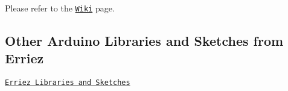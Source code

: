 Please refer to the \href{https://github.com/Erriez/ErriezArduinoLibrariesAndSketches/wiki}{\tt Wiki} page.

\subsection*{Other Arduino Libraries and Sketches from Erriez}


\begin{DoxyItemize}
\item \href{https://github.com/Erriez/ErriezArduinoLibrariesAndSketches}{\tt Erriez Libraries and Sketches} 
\end{DoxyItemize}